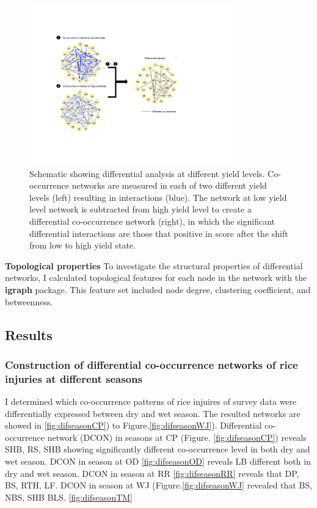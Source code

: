 \begin{figure}
\centering
\includegraphics[width = 0.8\textwidth]{figures/pipeline4.pdf}
\caption{Schematic showing differential analysis at different yield levels. Co-occurrence networks are measured in each of two different yield levels (left) resulting in interactions (blue). The network at low yield level network is subtracted from high yield level to create a differential co-occurrence network (right), in which the significant differential interactions are those that positive in score after the shift from low to high yield state.}
\label{fig:pipeline4}
\end{figure} 

\textbf{Topological properties}
To investigate the structural properties of differential networks, I calculated topological features for each node in the network with the \textbf{igraph} package. This feature set included node degree, clustering coefficient, and betweenness. 


\subsection{Results}

\subsubsection{Construction of differential co-occurrence networks of rice injuries at different seasons}

I determined which co-occurrence patterns of rice injuires of survey data were differentially expressed between dry and wet season. The resulted networks are showed in \ref{fig:difseasonCP}) to Figure.\ref{fig:difseasonWJ}). Differential co-occurrence network (DCON) in seasons at CP (Figure. \ref{fig:difseasonCP}) reveals SHB, RS, SHB showing significantly different co-occurrence level in both dry and wet season. DCON in season at OD \ref{fig:difseasonOD}
reveals LB different both in dry and wet season. DCON in season at RR \ref{fig:difseasonRR}  reveals that DP, BS, RTH, LF. DCON in season at WJ (Figure.\ref{fig:difseasonWJ} revealed that  BS, NBS, SHB BLS. \ref{fig:difseasonTM}

